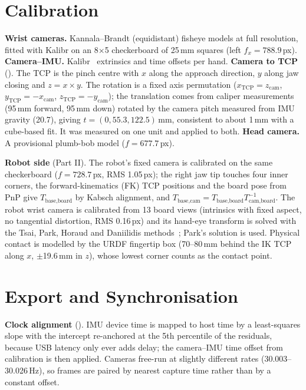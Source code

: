 \documentclass[conference,10pt]{IEEEtran}
\newcommand{\mm}{\,mm\xspace}
\begin{document}
\section{Calibration}\label{m:sec:cal}
\textbf{Wrist cameras.} Kannala--Brandt (equidistant) fisheye models at full resolution, fitted with Kalibr on an 8$\times$5
checkerboard of 25\mm squares (left $f_x{=}788.9$\,px). \textbf{Camera--IMU.} Kalibr~\cite{furgale2013kalibr} extrinsics and time
offsets per hand. \textbf{Camera to TCP} (). The TCP is the pinch
centre with $x$ along the approach direction, $y$ along jaw closing and $z = x\times y$. The rotation is a fixed axis permutation
($x_\text{TCP}=z_\text{cam}$, $y_\text{TCP}=-x_\text{cam}$, $z_\text{TCP}=-y_\text{cam}$); the translation comes from caliper
measurements (95\mm forward, 95\mm down) rotated by the camera pitch measured from IMU gravity (20.7\textdegree), giving
$t=(0, 55.3, 122.5)$\mm, consistent to about 1\mm with a cube-based fit. It was measured on one unit and applied to both.
\textbf{Head camera.} A provisional plumb-bob model ($f=677.7$\,px).

\textbf{Robot side} (Part II). The robot's fixed camera is calibrated on the same checkerboard ($f=728.7$\,px, RMS 1.05\,px); the
right jaw tip touches four inner corners, the forward-kinematics (FK) TCP positions and the board pose from PnP give
$T_\text{base,board}$ by Kabsch alignment, and $T_\text{base,cam}=T_\text{base,board}T_\text{cam,board}^{-1}$. The robot
wrist camera is calibrated from 13 board views (intrinsics with fixed aspect, no tangential distortion, RMS 0.16\,px) and its
hand-eye transform is solved with the Tsai, Park, Horaud and Daniilidis methods~\cite{tsai1989handeye}; Park's solution is used.
Physical contact is modelled by the URDF fingertip box (70--80\mm behind the IK TCP along $x$, $\pm$19.6\mm in $z$), whose
lowest corner counts as the contact point.

\section{Export and Synchronisation}\label{m:sec:export}
\textbf{Clock alignment} (). IMU device time is mapped to host time by a least-squares slope with the
intercept re-anchored at the 5th percentile of the residuals, because USB latency only ever adds delay; the camera--IMU time
offset from calibration is then applied. Cameras free-run at slightly different rates (30.003--30.026\,Hz), so frames are paired
by nearest capture time rather than by a constant offset.
\end{document}
